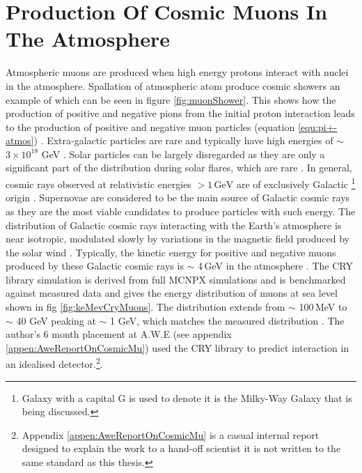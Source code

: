 \section{Production Of Cosmic Muons In The Atmosphere} 
Atmospheric muons are produced when high energy protons interact with nuclei in the atmosphere\cite{griffiths2008neutrinoOscillations}. Spallation of atmospheric atom produce cosmic showers an example of which  can be seen in figure \ref{fig:muonShower}. This shows how the production of positive and negative pions from the initial proton interaction leads to the production of positive and negative muon particles (equation \ref{equ:pi+-atmos}) \cite{griffiths2008neutrinoOscillations}. Extra-galactic particles are rare and typically have high energies of $\sim$ $3 \times 10^{18}$ GeV \cite{Drury2012OCosmicRays} \cite{ieee_cry_2007}. Solar particles can be largely disregarded as they are only a significant part of the distribution during solar flares, which are rare \cite{Zyla_pdg_2020} \cite{ieee_cry_2007}. In general, cosmic rays observed at  relativistic energies $> 1\,\textrm{GeV}$ are of exclusively Galactic \footnote{Galaxy with a capital G is used to denote it is the Milky-Way Galaxy that is being discussed.} origin \cite{Drury2012OCosmicRays}. Supernovae are considered to be the main source of Galactic cosmic rays as they are the most viable candidates to produce particles with such energy\cite{Drury2012OCosmicRays}. The distribution of Galactic cosmic rays interacting with the Earth's atmosphere is near isotropic, modulated slowly by variations in the magnetic field produced by the solar wind \cite{Zyla_pdg_2020}. Typically, the kinetic energy for positive and negative muons produced by these Galactic cosmic rays is $\sim$ 4\,GeV in the atmosphere \cite{Zyla_pdg_2020} \cite{MuonPhysics}. The CRY library simulation is derived from full MCNPX simulations and is benchmarked against measured data and gives the energy distribution of muons at sea level shown in fig \ref{fig:keMevCryMuons}. The distribution extends from $\sim$ 100\,MeV to $\sim$ 40 GeV peaking at $\sim$ 1 GeV, which matches the measured distribution \cite{ieee_cry_2007} \cite{Zyla_pdg_2020}. The author’s 6 month placement at A.W.E (see appendix \ref{appen:AweReportOnCosmicMu}) used the CRY library to predict interaction in an idealised detector.\footnote{Appendix \ref{appen:AweReportOnCosmicMu} is a casual internal report designed to explain the work to a hand-off scientist it is not written to the same standard as this thesis.}.

